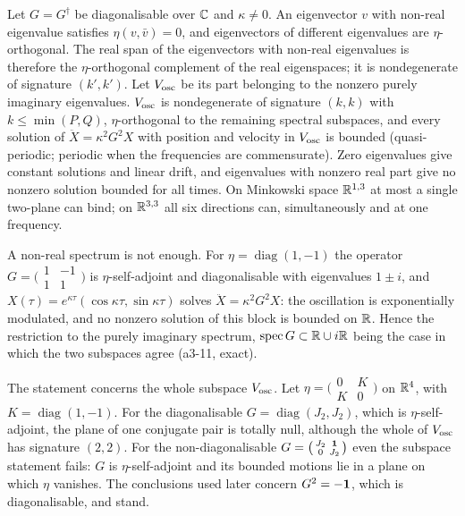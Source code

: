 \begin{proposition}
\label{prop:howmuch}
Let $G=G^\dagger$ be diagonalisable over $\mathbb{C}$ and $\kappa\neq0$. An eigenvector $v$ with non-real eigenvalue satisfies $\eta(v,\bar v)=0$, and
eigenvectors of different eigenvalues are $\eta$-orthogonal. The real span of the eigenvectors with non-real eigenvalues is therefore the
$\eta$-orthogonal complement of the real eigenspaces; it is nondegenerate of signature $(k',k')$. Let $V_{\rm osc}$ be its part belonging to the
nonzero purely imaginary eigenvalues. $V_{\rm osc}$ is nondegenerate of signature $(k,k)$ with $k\le\min(P,Q)$, $\eta$-orthogonal to the remaining
spectral subspaces, and every solution of $\ddot X=\kappa^2G^2X$ with position and velocity in $V_{\rm osc}$ is bounded (quasi-periodic; periodic when
the frequencies are commensurate). Zero eigenvalues give constant solutions and linear drift, and eigenvalues with nonzero real part give no
nonzero solution bounded for all times. On Minkowski space $\mathbb{R}^{1,3}$ at most a single two-plane can bind; on $\mathbb{R}^{3,3}$ all six directions can,
simultaneously and at one frequency.
\end{proposition}

A non-real spectrum is not enough. For $\eta=\operatorname{diag}(1,-1)$ the operator $G=\bigl(\begin{smallmatrix}1&-1\\1&1\end{smallmatrix}\bigr)$ is
$\eta$-self-adjoint and diagonalisable with eigenvalues $1\pm i$, and $X(\tau)=e^{\kappa\tau}(\cos\kappa\tau,\sin\kappa\tau)$ solves $\ddot X=\kappa^2G^2X$:
the oscillation is exponentially modulated, and no nonzero solution of this block is bounded on $\mathbb{R}$. Hence the restriction to the purely
imaginary spectrum, $\operatorname{spec}G\subset\mathbb{R}\cup i\mathbb{R}$ being the case in which the two subspaces agree (a3-11, exact).

The statement concerns the whole subspace $V_{\rm osc}$. Let $\eta=\bigl(\begin{smallmatrix}0&K\\K&0\end{smallmatrix}\bigr)$ on $\mathbb{R}^4$, with
$K=\operatorname{diag}(1,-1)$. For the diagonalisable $G=\operatorname{diag}(J_2,J_2)$, which is $\eta$-self-adjoint, the plane of one conjugate
pair is totally null, although the whole of $V_{\rm osc}$ has signature $(2,2)$. For the non-diagonalisable
$G=\bigl(\begin{smallmatrix}J_2&\mathbf 1\\0&J_2\end{smallmatrix}\bigr)$ even the subspace statement fails: $G$ is $\eta$-self-adjoint and its bounded
motions lie in a plane on which $\eta$ vanishes. The conclusions used later concern $G^2=-\mathbf 1$, which is
diagonalisable, and stand.

